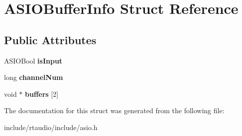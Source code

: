 \hypertarget{struct_a_s_i_o_buffer_info}{}\section{A\+S\+I\+O\+Buffer\+Info Struct Reference}
\label{struct_a_s_i_o_buffer_info}
\subsection*{Public Attributes}
\begin{DoxyCompactItemize}
\item 
A\+S\+I\+O\+Bool {\bfseries is\+Input}\hypertarget{struct_a_s_i_o_buffer_info_a433aa5ceefc9f74529ee35481dc8d2ab}{}\label{struct_a_s_i_o_buffer_info_a433aa5ceefc9f74529ee35481dc8d2ab}

\item 
long {\bfseries channel\+Num}\hypertarget{struct_a_s_i_o_buffer_info_af09d24856933f7643a08db27cc53139c}{}\label{struct_a_s_i_o_buffer_info_af09d24856933f7643a08db27cc53139c}

\item 
void $\ast$ {\bfseries buffers} \mbox{[}2\mbox{]}\hypertarget{struct_a_s_i_o_buffer_info_a73d512645baf02275665e862d5452636}{}\label{struct_a_s_i_o_buffer_info_a73d512645baf02275665e862d5452636}

\end{DoxyCompactItemize}


The documentation for this struct was generated from the following file\+:\begin{DoxyCompactItemize}
\item 
include/rtaudio/include/asio.\+h\end{DoxyCompactItemize}

